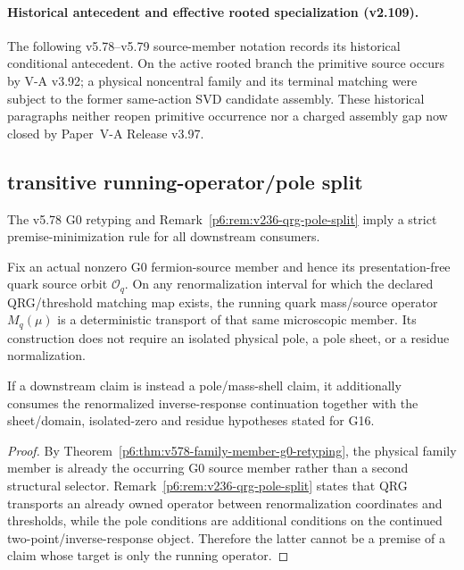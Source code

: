\documentclass[12pt,a4paper]{article}
\begin{document}
\paragraph{Historical antecedent and effective rooted specialization (v2.109).}
The following v5.78--v5.79 source-member notation records its historical
conditional antecedent.  On the active rooted branch the primitive source
occurs by V-A v3.92; a physical noncentral family and its terminal matching
were subject to the former same-action SVD candidate assembly. These
historical paragraphs neither reopen primitive occurrence nor a charged
assembly gap now closed by Paper~V-A Release v3.97.

\subsection{transitive running-operator/pole split}
\label{p6:sec:v579-transitive-rg-pole-split}

The v5.78 G0 retyping and Remark~\ref{p6:rem:v236-qrg-pole-split} imply a
strict premise-minimization rule for all downstream consumers.

\begin{theorem}
\label{p6:thm:v579-running-source-no-pole-premise}
Fix an actual nonzero G0 fermion-source member and hence its presentation-free
quark source orbit \(\mathcal O_q\).  On any renormalization interval for which
the declared QRG/threshold matching map exists, the running quark
mass/source operator \(M_q(\mu)\) is a deterministic transport of that same
microscopic member.  Its construction does not require an isolated physical
pole, a pole sheet, or a residue normalization.

If a downstream claim is instead a pole/mass-shell claim, it additionally
consumes the renormalized inverse-response continuation together with the
sheet/domain, isolated-zero and residue hypotheses stated for G16.
\end{theorem}
\begin{proof}
By Theorem~\ref{p6:thm:v578-family-member-g0-retyping}, the physical family
member is already the occurring G0 source member rather than a second
structural selector.  Remark~\ref{p6:rem:v236-qrg-pole-split} states that QRG
transports an already owned operator between renormalization coordinates and
thresholds, while the pole conditions are additional conditions on the
continued two-point/inverse-response object.  Therefore the latter cannot be a
premise of a claim whose target is only the running operator.
\end{proof}
\end{document}
